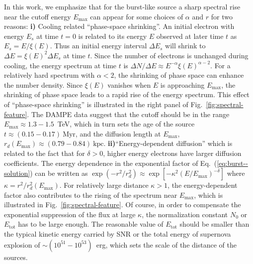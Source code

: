 \documentclass[aps,prl,twocolumn,a4paper]{revtex4}
\newcommand{\fig}[1]{Fig.~\ref{#1}}
\newcommand{\eq}[1]{Eq.~(\ref{#1})}
\begin{document}
In this work, we emphasize that for the burst-like source 
a sharp spectral rise near the cutoff energy $E_{\text{max}}$
can appear for some choices of $\alpha$ and $r$
for two reasons:
{\bf i)}  Cooling related ``phase-space shrinking''.
An initial  electron with energy $E_{s}$ at time $t=0$
is related to its energy $E$ observed at later time $t$ as $E_{s}=E/\xi(E)$.
Thus an initial energy interval  $\Delta E_{s}$ will shrink to 
$\Delta E=\xi(E)^{2} \Delta E_{s}$ at time $t$.
Since the number of electrons  is unchanged during cooling,
the energy spectrum at time $t$ is  
$\Delta N/\Delta E \approx E^{-\alpha}\xi(E)^{\alpha-2}$.
For a relatively hard spectrum with  $\alpha <2$, 
the shrinking of phase space  can enhance the number density.
Since $\xi(E)$ vanishes when $E$ is approaching $E_{\text{max}}$,
the shrinking of phase space leads 
to a rapid rise of the energy spectrum.
This effect of ``phase-space shrinking'' is illustrated  in
the right panel of \fig{fig:spectral-feature}.
The DAMPE data suggest that the cutoff  should be 
in the range $E_{\text{max}}\approx 1.3-1.5$~TeV,
which in turn sets the  age of the source
$t  %
\approx  (0.15-0.17)~\text{Myr}$,
and the diffusion length at $E_{\text{max}}$, 
$r_{d}(E_{\text{max}}) \approx (0.79-0.84)~\text{kpc}$.
{\bf ii)}``Energy-dependent diffusion'' which is related to 
the fact that for $\delta>0$,
higher energy electrons have larger diffusion coefficients.
The energy dependence in the exponential factor
of \eq{eq:burst--solution} can be written as
$\exp(-r^2/r_d^2)\approx \exp[- \kappa^{2}(E/E_{\text{max}})^{-\delta}]$
where $\kappa=r^{2}/r_{d}^{2}(E_{\text{max}})$.
For relatively  large distance  $\kappa >1$, 
the energy-dependent factor also contributes to the rising of the spectrum near $E_{\text{max}}$,
which  is illustrated in  \fig{fig:spectral-feature}.
Of course, in order to  compensate the exponential suppression of the flux at 
large $\kappa$, 
the  normalization constant $N_{0}$ 
or $E_{\text{tot}}$ has to be large enough.
The reasonable value of $E_{\text{tot}}$ should be smaller than 
the typical kinetic energy carried by SNR 
or the total energy of supernova explosion of  
$\sim(10^{51}-10^{53})$~erg,
which sets the scale of the distance of the sources.
\end{document}
